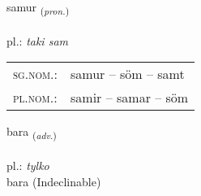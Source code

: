 \documentclass[frontgrid, backgrid]{flacards}\usepackage[]{graphicx}\usepackage[]{xcolor}
\begin{document}
\renewcommand{\flhead}{\vskip5pt \fboxsep=0pt {\small\bfseries\footnotesize Fornafn | Pronoun}}
\renewcommand{\fcfoot}{\vskip5pt \fboxsep=0pt \hspace{2pt}{\small\bfseries\footnotesize 1K}}

\renewcommand{\blhead}{\vskip5pt {\small\bfseries\footnotesize Fornafn | Pronoun }}
\renewcommand{\bcfoot}{\vskip5pt \hspace{2pt}{\small\bfseries\footnotesize 1K}}


{samur \small{\textsubscript{(\textit{pron.})}} \\[1ex] %
\textphonetic{[saːmʏr]} \\
pl.: \emph{taki sam} \\  [2ex]
\renewcommand*{\arraystretch}{0.8}
\begin{tabular}{ll}
\textsc{sg.nom.}: & samur  --  söm -- samt \\ 
\textsc{pl.nom.}: & samir -- samar -- söm
\end{tabular}
}


\renewcommand{\flhead}{\vskip5pt \fboxsep=0pt {\small\bfseries\footnotesize Atviksorð | Adverb}}
\renewcommand{\fcfoot}{\vskip5pt \fboxsep=0pt \hspace{2pt}{\small\bfseries\footnotesize 1K}}

\renewcommand{\blhead}{\vskip5pt {\small\bfseries\footnotesize Atviksorð | Adverb }}
\renewcommand{\bcfoot}{\vskip5pt \hspace{2pt}{\small\bfseries\footnotesize 1K}}


{bara \small{\textsubscript{(\textit{adv.})}} \\[1ex]
\textphonetic{[paːra]} \\
pl.: \emph{tylko} \\  [2ex]
bara (Indeclinable)}

\renewcommand{\flhead}{\vskip5pt \fboxsep=0pt {\small\bfseries\footnotesize Lýsingarorð | Adjective}}
\renewcommand{\fcfoot}{\vskip5pt \fboxsep=0pt \hspace{2pt}{\small\bfseries\footnotesize 1K}}
\end{document}
